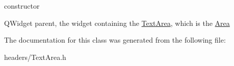 constructor 

\-Q\-Widget parent, the widget containing the \hyperlink{class_text_area}{\-Text\-Area}, which is the \hyperlink{class_area}{\-Area} 

\-The documentation for this class was generated from the following file\-:\begin{DoxyCompactItemize}
\item 
headers/\-Text\-Area.\-h\end{DoxyCompactItemize}
